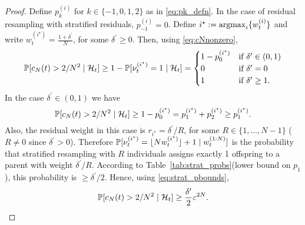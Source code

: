 \begin{proof}
Define $p_k^{(i)}$ for $k\in\{-1,0,1,2\}$ as in \eqref{eq:pk_defn}. In the case of residual resampling with stratified residuals, $p_{-1}^{(i)} =0$. 
Define $i^\star := \argmax_i \{ w_t^{(i)} \}$ and write
$w_t^{(i^\star)} = \frac{1+\delta^\prime}{N}$, for some $\delta^\prime \geq 0$.
Then, using \eqref{eq:cNnonzero}, 
\begin{equation*}
\Prob[ c_N(t) > 2/N^2 \mid \mathcal{H}_t ]
\geq 1- \Prob[ \nu_t^{(i^\star)} =1 \mid \mathcal{H}_t ]
= \begin{cases}
    1 - p_0^{(i^\star)} & \text{if } \delta^\prime \in (0,1) \\
    0 & \text{if } \delta^\prime = 0 \\
    1 & \text{if } \delta^\prime \geq 1 .
\end{cases}
\end{equation*}
In the case $\delta^\prime \in (0,1)$ we have
\begin{equation*}
\Prob[ c_N(t) > 2/N^2 \mid \mathcal{H}_t ]
\geq 1 - p_0^{(i^\star)}
= p_1^{(i^\star)} + p_2^{(i^\star)} 
\geq p_1^{(i^\star)} .
\end{equation*}
Also, the residual weight in this case is $r_{i^\star} = \delta^\prime /R$, for some $R\in\{1, \dots, N-1\}$ ($R \neq 0$ since $\delta^\prime > 0$).
Therefore $\Prob[ \nu_t^{(i^\star)} = \flnw[i^\star] + 1 \mid w_t^{(1:N)} ]$ is the probability that stratified resampling with $R$ individuals assigns exactly 1 offspring to a parent with weight $\delta^\prime /R$. According to Table~\ref{tab:strat_probs}(lower bound on $p_1$), this probability is $\geq \delta^\prime /2$.
Hence, using \eqref{eq:strat_pbounds}, 
\begin{equation*}
\Prob[ c_N(t) > 2/N^2 \mid \mathcal{H}_t ]
\geq \frac{\delta^\prime}{2} \varepsilon^{2N} .
\end{equation*}

\end{proof}
